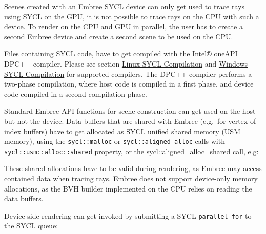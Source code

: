 Scenes created with an Embree SYCL device can only get used to trace
rays using SYCL on the GPU, it is not possible to trace rays on the CPU
with such a device. To render on the CPU and GPU in parallel, the user
has to create a second Embree device and create a second scene to be
used on the CPU.

Files containing SYCL code, have to get compiled with the Intel® oneAPI
DPC++ compiler. Please see section
\hyperref[linux-sycl-compilation]{Linux SYCL Compilation} and
\hyperref[windows-sycl-compilation]{Windows SYCL Compilation} for
supported compilers. The DPC++ compiler performs a two-phase
compilation, where host code is compiled in a first phase, and device
code compiled in a second compilation phase.

Standard Embree API functions for scene construction can get used on the
host but not the device. Data buffers that are shared with Embree
(e.g.~for vertex of index buffers) have to get allocated as SYCL unified
shared memory (USM memory), using the \texttt{sycl::malloc} or
\texttt{sycl::aligned\_alloc} calls with
\texttt{sycl::usm::alloc::shared} property, or the
sycl::aligned\_alloc\_shared call, e.g:

\begin{Shaded}
\begin{Highlighting}[]
\OperatorTok{*}\OperatorTok{=}\OperatorTok{::}\OperatorTok{(}\OperatorTok{,}\OperatorTok{,}\OperatorTok{,}\OperatorTok{::}\OperatorTok{::}\OperatorTok{::}\OperatorTok{);}
\end{Highlighting}
\end{Shaded}

These shared allocations have to be valid during rendering, as Embree
may access contained data when tracing rays. Embree does not support
device-only memory allocations, as the BVH builder implemented on the
CPU relies on reading the data buffers.

Device side rendering can get invoked by submitting a SYCL
\texttt{parallel\_for} to the SYCL queue:

